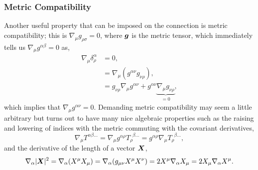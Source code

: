 \subsubsection{Metric Compatibility}
Another useful property that can be imposed on the connection is metric compatibility; this is $\nabla_\mu g_{\rho\sigma}=0$, where $\boldsymbol{g}$ is the metric tensor, which immediately tells us $\nabla_\mu g^{\alpha\beta}=0$ as, 
\begin{align}
\nabla_\mu \delta^\alpha_\rho &= 0, \\ 
&=  \nabla_\mu(g^{\alpha \nu}g_{\nu \rho}) ,\\
&= g_{\nu \rho}\nabla_\mu g^{\alpha \nu} + g^{\alpha \nu}\underbrace{\nabla_\mu g_{\nu \rho}}_{=0},
\end{align}
which implies that $\nabla_\mu g^{\alpha\nu}=0$. Demanding metric compatibility may seem a little arbitrary but turns out to have many nice algebraic properties such as the raising and lowering of indices with the metric commuting with the covariant derivatives,
\begin{equation} \nabla_{\mu} T^{\alpha \beta ...} = \nabla_\mu g^{\alpha\rho}T_{\rho}^{\,\,\,\beta ...} = g^{\alpha\rho} \nabla_\mu T_{\rho}^{\,\,\,\beta ...}, \end{equation}
and the derivative of the length of a vector $\boldsymbol{X}$,
\begin{equation}
\nabla_\alpha |\boldsymbol{X}|^2=\nabla_\alpha (X^\mu X_\mu) = \nabla_\alpha (g_{\mu\nu}X^\mu X^\nu) = 2 X^\mu \nabla_\alpha X_\mu = 2 X_\mu \nabla_\alpha X^\mu.
\end{equation}


